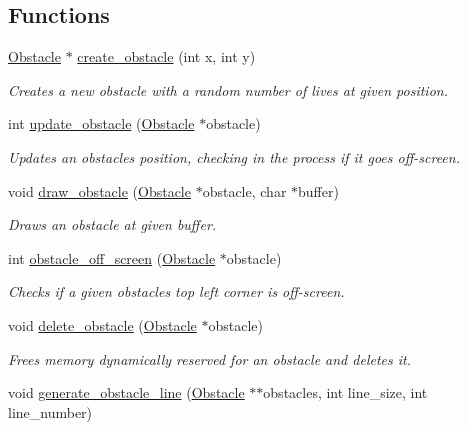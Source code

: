 \subsection*{Functions}
\begin{DoxyCompactItemize}
\item 
\hyperlink{struct_obstacle}{Obstacle} $\ast$ \hyperlink{group__obstacle_ga6624b86ef2320877c0935fb660f21dab}{create\+\_\+obstacle} (int x, int y)
\begin{DoxyCompactList}\small\item\em Creates a new obstacle with a random number of lives at given position. \end{DoxyCompactList}\item 
int \hyperlink{group__obstacle_gaf9a8875cab767c12b00817ed1b62ae4f}{update\+\_\+obstacle} (\hyperlink{struct_obstacle}{Obstacle} $\ast$obstacle)
\begin{DoxyCompactList}\small\item\em Updates an obstacle\textquotesingle{}s position, checking in the process if it goes off-\/screen. \end{DoxyCompactList}\item 
void \hyperlink{group__obstacle_ga9d4a8c6e21f6ef41233418d870b4a9c4}{draw\+\_\+obstacle} (\hyperlink{struct_obstacle}{Obstacle} $\ast$obstacle, char $\ast$buffer)
\begin{DoxyCompactList}\small\item\em Draws an obstacle at given buffer. \end{DoxyCompactList}\item 
int \hyperlink{group__obstacle_ga23812cfe6d34ed6fe00446f5e794a46e}{obstacle\+\_\+off\+\_\+screen} (\hyperlink{struct_obstacle}{Obstacle} $\ast$obstacle)
\begin{DoxyCompactList}\small\item\em Checks if a given obstacle\textquotesingle{}s top left corner is off-\/screen. \end{DoxyCompactList}\item 
void \hyperlink{group__obstacle_ga97f5becf2591663ecfe77e6da1f6aa2e}{delete\+\_\+obstacle} (\hyperlink{struct_obstacle}{Obstacle} $\ast$obstacle)
\begin{DoxyCompactList}\small\item\em Frees memory dynamically reserved for an obstacle and deletes it. \end{DoxyCompactList}\item 
void \hyperlink{group__obstacle_ga3c63dba1f24ebe9bef3e2dd2a5498006}{generate\+\_\+obstacle\+\_\+line} (\hyperlink{struct_obstacle}{Obstacle} $\ast$$\ast$obstacles, int line\+\_\+size, int line\+\_\+number)
$$
\end{DoxyCompactItemize}
